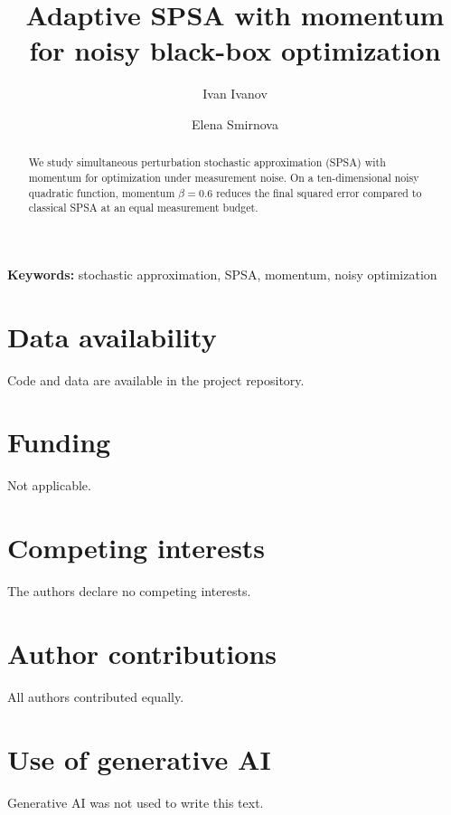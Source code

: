 \documentclass[11pt]{article}
\title{Adaptive SPSA with momentum for noisy black-box optimization}
\author[1]{Ivan Ivanov}
\author[1]{Elena Smirnova}
\affil[1]{Stochastic Optimization Lab, Example University}
\newcommand{\keywords}[1]{\par\noindent\textbf{Keywords:} #1}
\begin{document}
\maketitle

\begin{abstract}
We study simultaneous perturbation stochastic approximation (SPSA) with momentum for optimization under measurement noise. On a ten-dimensional noisy quadratic function, momentum $\beta = 0.6$ reduces the final squared error compared to classical SPSA at an equal measurement budget.
\end{abstract}
\keywords{stochastic approximation, SPSA, momentum, noisy optimization}







\section*{Data availability}
Code and data are available in the project repository.

\section*{Funding}
Not applicable.

\section*{Competing interests}
The authors declare no competing interests.

\section*{Author contributions}
All authors contributed equally.

\section*{Use of generative AI}
Generative AI was not used to write this text.



\end{document}
